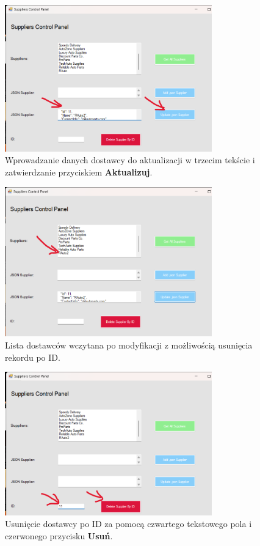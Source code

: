 \begin{figure}[h!]
    \centering
    \includegraphics[width=0.8\textwidth]{img_tests/suppliers_test_6.png}
    \caption{Wprowadzanie danych dostawcy do aktualizacji w trzecim tekście i zatwierdzanie przyciskiem \textbf{Aktualizuj}.}
    \label{fig:suppliers_test_6}
\end{figure}

\begin{figure}[h!]
    \centering
    \includegraphics[width=0.8\textwidth]{img_tests/suppliers_test_7.png}
    \caption{Lista dostawców wczytana po modyfikacji z możliwością usunięcia rekordu po ID.}
    \label{fig:suppliers_test_7}
\end{figure}

\begin{figure}[h!]
    \centering
    \includegraphics[width=0.8\textwidth]{img_tests/suppliers_test_8.png}
    \caption{Usunięcie dostawcy po ID za pomocą czwartego tekstowego pola i czerwonego przycisku \textbf{Usuń}.}
    \label{fig:suppliers_test_8}
\end{figure}

